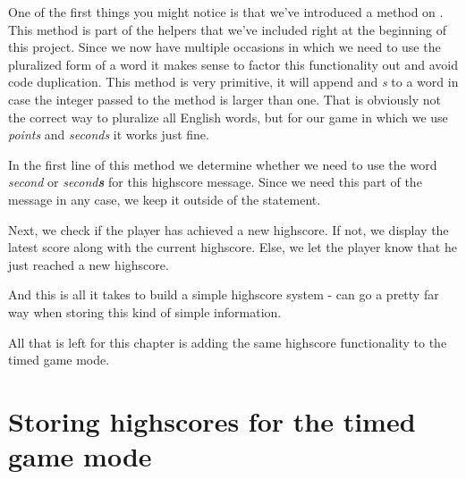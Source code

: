 One of the first things you might notice is that we've introduced a
 method on . This method is
part of the helpers that we've included right at the beginning of this project.
Since we now have multiple occasions in which we need to use the pluralized form
of a word it makes sense to factor this functionality out and avoid code
duplication. This  method is very primitive, it will
append and \textit{s} to a word in case the integer passed to the method is
larger than one. That is obviously not the correct way to pluralize all English 
words, but for our game in which we use \textit{points} and \textit{seconds} it
works just fine.

In the first line of this method we determine whether we need to use the word
\textit{second} or \textit{second\textbf{s}} for this highscore message. Since
we need this part of the message in any case, we keep it outside of the
 statement.

Next, we check if the player has achieved a new highscore. If not, we display
the latest score along with the current highscore. Else, we let the player know
that he just reached a new highscore.

And this is all it takes to build a simple highscore system -
 can go a pretty far way when storing this kind of
simple information.

All that is left for this chapter is adding the same highscore functionality to
the timed game mode.

\section{Storing highscores for the timed game mode}
